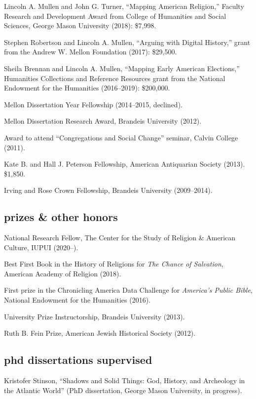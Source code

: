 \documentclass[11pt]{article}
\begin{document}
Lincoln A. Mullen and John G. Turner, ``Mapping American Religion,'' Faculty Research and Development Award from College of Humanities and Social Sciences, George Mason University (2018): \$7,998.

Stephen Robertson and Lincoln A. Mullen, ``Arguing with Digital History,'' grant from the Andrew W. Mellon Foundation (2017): \$29,500.

Sheila Brennan and Lincoln A. Mullen, ``Mapping Early American Elections,'' Humanities Collections and Reference Resources grant from the National Endowment for the Humanities (2016--2019): \$200,000. 

Mellon Dissertation Year Fellowship (2014--2015, declined).

Mellon Dissertation Research Award, Brandeis University (2012).

Award to attend ``Congregations and Social Change'' seminar, Calvin College 
(2011).

Kate B. and Hall J. Peterson Fellowship, American Antiquarian Society (2013). \$1,850.

Irving and Rose Crown Fellowship, Brandeis University (2009--2014).

\subsection{prizes \& other honors}\label{prizes-and-awards}

National Research Fellow, The Center for the Study of Religion \& American
Culture, IUPUI (2020--).

Best First Book in the History of Religions for \emph{The Chance of Salvation}, American Academy of Religion (2018).

First prize in the Chronicling America Data Challenge for \emph{America's Public Bible}, National Endowment for the Humanities (2016).

University Prize Instructorship, Brandeis University (2013).

Ruth B. Fein Prize, American Jewish Historical Society (2012). 

\subsection{phd dissertations supervised}\label{dissertations}

Kristofer Stinson, ``Shadows and Solid Things: God, History, and Archeology in the Atlantic World'' (PhD dissertation, George Mason University, in progress).
\end{document}
